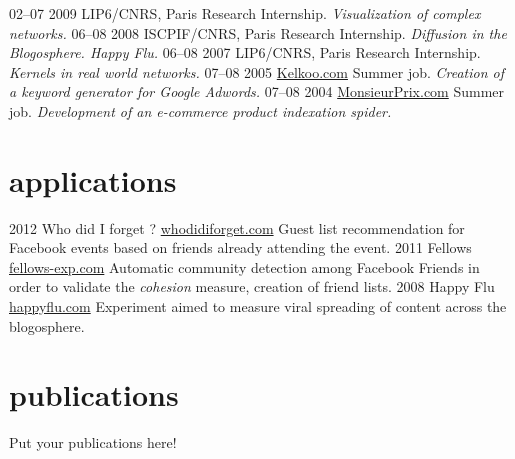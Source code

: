 \documentclass[]{friggeri-cv}
\begin{document}
\begin{entrylist}
  \entry
    {02–07 2009}
    {LIP6/CNRS, Paris}
    {Research Internship.}
    {\emph{Visualization of complex networks.}}
  \entry
    {06–08 2008}
    {ISCPIF/CNRS, Paris}
    {Research Internship.}
    {\emph{Diffusion in the Blogosphere. Happy Flu.}}
  \entry
    {06–08 2007}
    {LIP6/CNRS, Paris}
    {Research Internship.}
    {\emph{Kernels in real world networks.}}
  \entry
    {07–08 2005}
    {\href{http://www.kelkoo.com}{Kelkoo.com}}
    {Summer job.}
    {\emph{Creation of a keyword generator for Google Adwords.}}
  \entry
    {07–08 2004}
    {\href{http://www.monsieurprix.com}{MonsieurPrix.com}}
    {Summer job.}
    {\emph{Development of an e-commerce product indexation spider.}}
\end{entrylist}

\section{applications}

\begin{entrylist}
  \entry
    {2012}
    {Who did I forget ?}
    {\href{http://whodidiforget.com}{whodidiforget.com}}
    {Guest list recommendation for Facebook events based on friends already attending the event.}
  \entry
    {2011}
    {Fellows}
    {\href{http://fellows-exp.com}{fellows-exp.com}}
    {Automatic community detection among Facebook Friends in order to validate the \emph{cohesion} measure, creation of friend lists.}
  \entry
    {2008}
    {Happy Flu}
    {\href{http://happyflu.com}{happyflu.com}}
    {Experiment aimed to measure viral spreading of content across the blogosphere.}
\end{entrylist}

\section{publications}

Put your publications here!

% 
\end{document}
